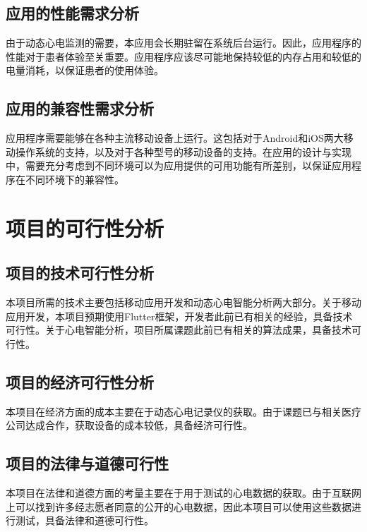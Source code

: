 \subsection{应用的性能需求分析}\label{subsec:performance}

由于动态心电监测的需要，本应用会长期驻留在系统后台运行。因此，应用程序的性能对于患者体验至关重要。应用程序应该尽可能地保持较低的内存占用和较低的电量消耗，以保证患者的使用体验。

\subsection{应用的兼容性需求分析}\label{subsec:compatibility}

应用程序需要能够在各种主流移动设备上运行。这包括对于Android和iOS两大移动操作系统的支持，以及对于各种型号的移动设备的支持。在应用的设计与实现中，需要充分考虑到不同环境可以为应用提供的可用功能有所差别，以保证应用程序在不同环境下的兼容性。


\section{项目的可行性分析}\label{sec:feasibility}

\subsection{项目的技术可行性分析}\label{subsec:tech-feasibility}

本项目所需的技术主要包括移动应用开发和动态心电智能分析两大部分。关于移动应用开发，本项目预期使用Flutter框架，开发者此前已有相关的经验，具备技术可行性。关于心电智能分析，项目所属课题此前已有相关的算法成果\cite{songDongtaixindiantudezhinengjiancesuanfayanjiuyuyingyong2022}，具备技术可行性。

\subsection{项目的经济可行性分析}\label{subsec:economic-feasibility}

本项目在经济方面的成本主要在于动态心电记录仪的获取。由于课题已与相关医疗公司达成合作，获取设备的成本较低，具备经济可行性。

\subsection{项目的法律与道德可行性}\label{subsec:legal-feasibility}

本项目在法律和道德方面的考量主要在于用于测试的心电数据的获取。由于互联网上可以找到许多经志愿者同意的公开的心电数据，因此本项目可以使用这些数据进行测试，具备法律和道德可行性。
